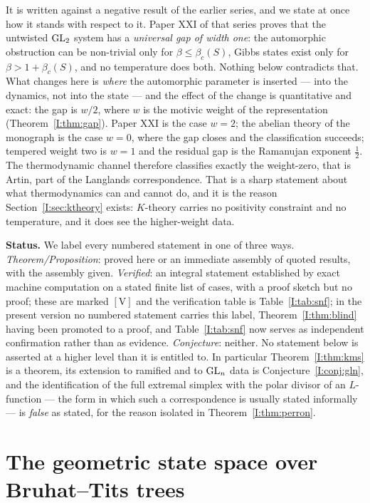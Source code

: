 It is written against a negative result of the earlier series, and we state at once how
it stands with respect to it. Paper XXI of that series proves that the untwisted $\mathrm{GL}_2$
system has a \emph{universal gap of width one}: the automorphic obstruction can be
non-trivial only for $\beta\le\beta_c(S)$, Gibbs states exist only for
$\beta>1+\beta_c(S)$, and no temperature does both. Nothing below contradicts that.
What changes here is \emph{where} the automorphic parameter is inserted --- into the
dynamics, not into the state --- and the effect of the change is quantitative and exact:
the gap is $w/2$, where $w$ is the motivic weight of the representation
(Theorem~\ref{I:thm:gap}). Paper XXI is the case $w=2$; the abelian theory of the monograph
is the case $w=0$, where the gap closes and the classification succeeds; tempered weight
two is $w=1$ and the residual gap is the Ramanujan exponent $\tfrac12$. The thermodynamic
channel therefore classifies exactly the weight-zero, that is Artin, part of the Langlands
correspondence. That is a sharp statement about what thermodynamics can and cannot do,
and it is the reason Section~\ref{I:sec:ktheory} exists: $K$-theory carries no positivity
constraint and no temperature, and it does see the higher-weight data.

\smallskip
\noindent\textbf{Status.} We label every numbered statement in one of three ways.
\emph{Theorem/Proposition}: proved here or an immediate assembly of quoted results, with
the assembly given. \emph{Verified}: an integral statement established by exact machine
computation on a stated finite list of cases, with a proof sketch but no proof; these are
marked $[\mathrm{V}]$ and the verification table is Table~\ref{I:tab:snf}; in the present
version no numbered statement carries this label, Theorem~\ref{I:thm:blind} having been
promoted to a proof, and Table~\ref{I:tab:snf} now serves as independent confirmation
rather than as evidence. \emph{Conjecture}:
neither. No statement below is asserted at a higher level than it is entitled to. In
particular Theorem~\ref{I:thm:kms} is a theorem, its extension to ramified and to $\mathrm{GL}_n$
data is Conjecture~\ref{I:conj:gln}, and the identification of the full extremal simplex
with the polar divisor of an $L$-function --- the form in which such a correspondence is
usually stated informally --- is \emph{false} as stated, for the reason isolated in
Theorem~\ref{I:thm:perron}.

\section{The geometric state space over Bruhat--Tits trees}\label{I:sec:geometry}

